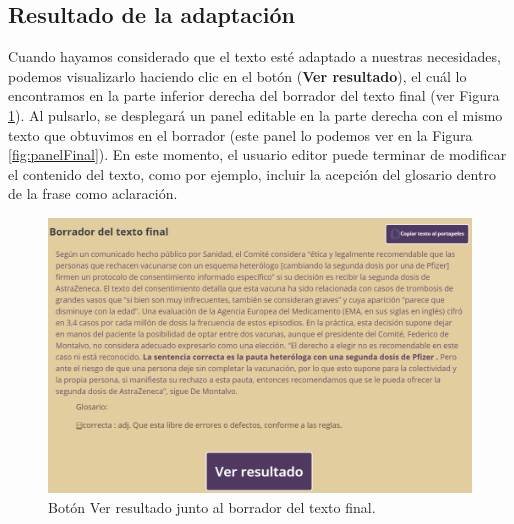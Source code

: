 \subsection{Resultado de la adaptación}
 
Cuando hayamos considerado que el texto esté adaptado a nuestras necesidades, podemos visualizarlo haciendo clic en el botón (\textbf{Ver resultado}), el cuál lo encontramos en la parte inferior derecha del borrador del texto final (ver Figura \ref{fig:botonResultado}). Al pulsarlo, se desplegará un panel editable en la parte derecha con el mismo texto que obtuvimos en el borrador (este panel lo podemos ver en la Figura \ref{fig:panelFinal}). En este momento, el usuario editor puede terminar de modificar el contenido del texto, como por ejemplo, incluir la acepción del glosario dentro de la frase como aclaración.
\begin{figure}[h!]
	\centering
	
	
	\includegraphics[scale=0.8]{Imagenes/Figuras/verResultado}
	
	
	\caption{Botón Ver resultado junto al borrador del texto final.}
	\label{fig:botonResultado}
\end{figure}
